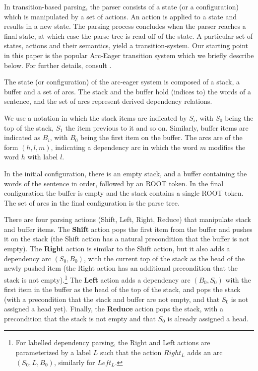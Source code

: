 \documentclass[11pt,letterpaper]{article}
\begin{document}
In transition-based parsing, the parser consists of a state (or a
configuration) which is manipulated by a set of actions.  An action is
applied to a state and results in a new state.  The parsing process
concludes when the parser reaches a final state, at which case the
parse tree is read off of the state.  A particular set of states,
actions and their semantics, yield a transition-system. Our starting
point in this paper is the popular Arc-Eager transition system which
we briefly describe below.  For further details, consult
\citet{nivre:04}.

The state (or configuration) of the arc-eager system is composed of a
stack, a buffer and a set of arcs.
The stack and the buffer hold (indices to) the words of a sentence,
and the set of arcs represent derived dependency relations.

We use a notation in which the stack items are indicated by $S_i$,
with $S_0$ being the top of the stack, $S_1$ the item previous to it
and so on.  Similarly, buffer items are indicated as $B_i$, with
$B_0$ being the first item on the buffer.  The arcs are of the form
$(h,l,m)$, indicating a dependency arc in which the word $m$ modifies
the word $h$ with label $l$.

In the initial configuration, there is an empty stack, and a
buffer containing the words of the sentence in order, followed by an
ROOT token.
In the final configuration the buffer is empty and the stack contains
a single ROOT token. The set of arcs in the final configuration is the
parse tree.

There are four parsing actions (Shift, Left, Right, Reduce) that
manipulate stack and buffer items.  The \textbf{Shift} action pops the
first item from the buffer and pushes it on the stack (the Shift
action has a natural precondition that the buffer is not empty).  The
\textbf{Right} action is similar to the Shift action, but it also adds
a dependency arc $(S_0, B_0)$,
with the current top of the stack as the head of the newly pushed item
(the Right action has an additional precondition that the stack is not
empty).\footnote{%
For labelled dependency parsing, the Right and Left actions are
parameterized by a label $L$ such that the action $Right_L$ adds an
arc $(S_0, L, B_0)$, similarly for $Left_L$.}
The \textbf{Left} action adds a dependency arc $(B_0, S_0)$ with the
first item in the buffer as the head of the top of the stack, and pops
the stack (with a precondition that the stack and buffer are not
empty, and that $S_0$ is not assigned a head yet). Finally, the
\textbf{Reduce} action pops the stack, with a precondition that the
stack is not empty and that $S_0$ is already assigned a head.
\end{document}
